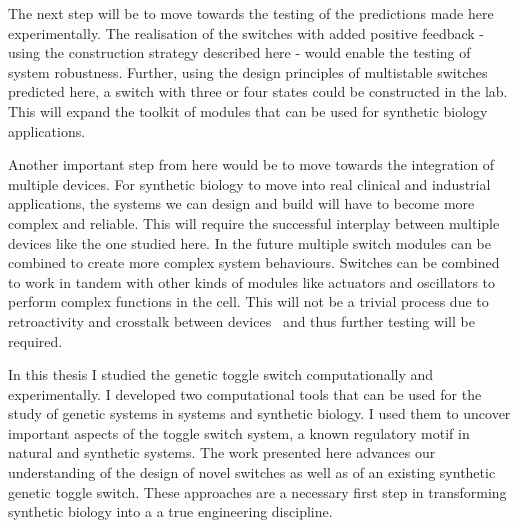 The next step will be to move towards the testing of the predictions made here experimentally. The realisation of the switches with added positive feedback - using the construction strategy described here - would enable the testing of system robustness. Further, using the design principles of multistable switches predicted here, a switch with three or four states could be constructed in the lab. This will expand the toolkit of modules that can be used for synthetic biology applications. 

Another important step from here would be to move towards the integration of multiple devices. For synthetic biology to move into real clinical and industrial applications, the systems we can design and build will have to become more complex and reliable. This will require the successful interplay between multiple devices like the one studied here. In the future multiple switch modules can be combined to create more complex system behaviours. Switches can be combined to work in tandem with other kinds of modules like actuators and oscillators to perform complex functions in the cell. This will not be a trivial process due to retroactivity and crosstalk between devices~\autocite{DelVecchio:2008gy} and thus further testing will be required.

In this thesis I studied the genetic toggle switch computationally and experimentally. I developed two computational tools that can be used for the study of genetic systems in systems and synthetic biology. I used them to uncover important aspects of the toggle switch system, a known regulatory motif in natural and synthetic systems. The work presented here advances our understanding of the design of novel switches as well as of an existing synthetic genetic toggle switch. These approaches are a necessary first step in transforming synthetic biology into a a true engineering discipline.



